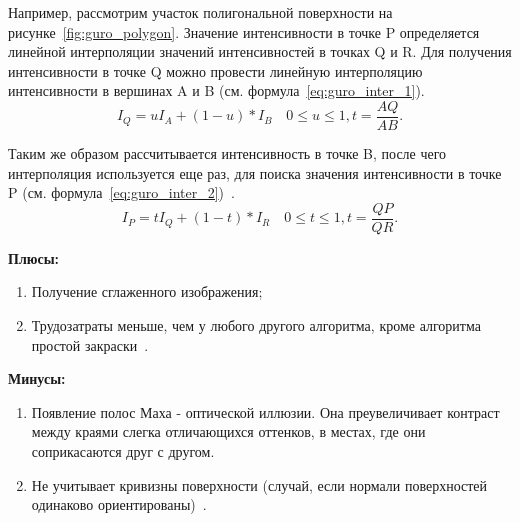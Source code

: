 Например, рассмотрим участок полигональной поверхности на рисунке~\ref{fig:guro_polygon}.
Значение интенсивности в точке P
определяется линейной интерполяции значений интенсивностей в точках Q и R.
Для получения интенсивности в точке Q можно провести линейную интерполяцию интенсивности в вершинах A и B (см. формула~\ref{eq:guro_inter_1}).
\begin{equation} 
	I_Q = uI_A+(1-u)*I_B  \quad 0 \leq u \leq 1, t = \frac{AQ}{AB}.
	\label{eq:guro_inter_1}
\end{equation}

Таким же образом рассчитывается интенсивность в точке B, после чего интерполяция используется еще раз, для поиска значения интенсивности в точке P 
(см. формула~\ref{eq:guro_inter_2})~\cite{Rodgers}.
\begin{equation} 
	I_P = tI_Q+(1-t)*I_R  \quad 0 \leq t \leq 1, t = \frac{QP}{QR}.
	\label{eq:guro_inter_2}
\end{equation}

\newpage

\textbf{Плюсы:}
\begin{enumerate}
	\item Получение сглаженного изображения;
	\item Трудозатраты меньше, чем у любого другого алгоритма, кроме алгоритма простой закраски~\cite{Rodgers}.
\end{enumerate}

\textbf{Минусы:}
\begin{enumerate}
	\item Появление полос Маха - оптической иллюзии. 
	Она преувеличивает контраст между краями слегка отличающихся оттенков, в местах, где они соприкасаются друг с другом.
	\item Не учитывает кривизны поверхности (случай, если нормали поверхностей одинаково ориентированы)~\cite{Rodgers}.
\end{enumerate}


